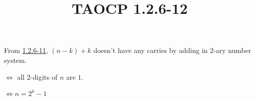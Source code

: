 \documentclass{article}
\title{TAOCP 1.2.6\mbox{-}12}
\begin{document}
\maketitle

From \href{./1.2.6-11.pdf}{1.2.6\mbox{-}11}, \( (n-k) + k \) doesn't have any carries by adding in \( 2 \)-ary number system.

\( \iff \) all 2-digits of \( n \) are \( 1 \).

\( \iff n = 2^{k} - 1 \)
\end{document}
